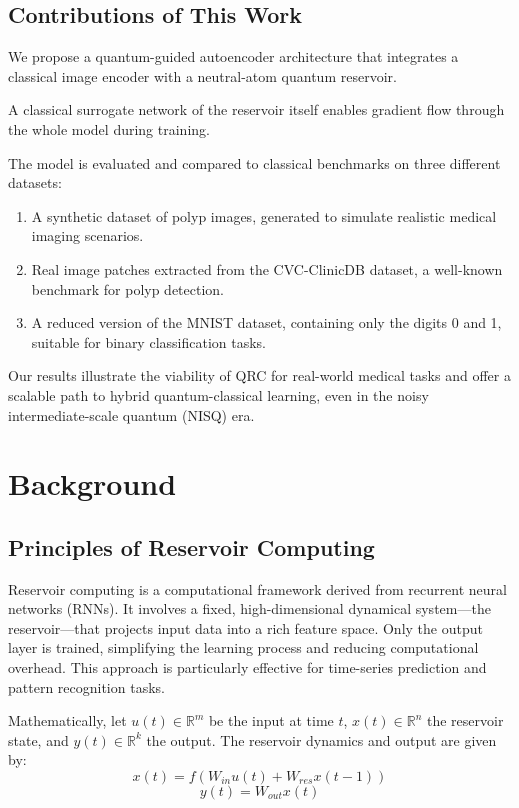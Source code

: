 \documentclass[conference]{IEEEtran}
\begin{document}
\subsection{Contributions of This Work}
We propose a quantum-guided autoencoder architecture that 
integrates a classical image encoder with a neutral-atom
quantum reservoir.

A classical surrogate network of the reservoir itself enables 
gradient flow through the whole model during training.

The model is evaluated and compared to classical benchmarks on three 
different datasets: 
\begin{enumerate}
    \item A synthetic dataset of polyp images, generated to simulate realistic medical imaging scenarios.
    \item Real image patches extracted from the CVC-ClinicDB dataset, a well-known benchmark for polyp detection.
    \item A reduced version of the MNIST dataset, containing only the digits 0 and 1, suitable for binary classification tasks.
\end{enumerate}

Our results illustrate the viability of QRC for real-world medical 
tasks and offer a scalable path to hybrid quantum-classical learning,
even in the noisy intermediate-scale quantum (NISQ) era.


\section{Background}

\subsection{Principles of Reservoir Computing}
Reservoir computing is a computational framework 
derived from recurrent neural networks (RNNs). It 
involves a fixed, high-dimensional dynamical system—the 
reservoir—that projects input data into a rich feature 
space. Only the output layer is trained, simplifying 
the learning process and reducing computational 
overhead. This approach is particularly effective 
for time-series prediction and pattern recognition tasks.

Mathematically, let \( u(t) \in \mathbb{R}^m \) be the input at time \( t \),
\( x(t) \in \mathbb{R}^n \) the reservoir state, and
\( y(t) \in \mathbb{R}^k \) the output. The reservoir dynamics
and output are given by:
\begin{equation}
    x(t) = f(W_{in} u(t) + W_{res} x(t-1))
\end{equation}
\begin{equation}
    y(t) = W_{out} x(t)
\end{equation}
\end{document}

